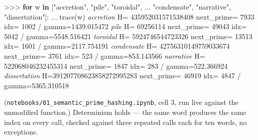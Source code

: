 \documentclass[
  10pt,
]{article}
\newenvironment{Shaded}{}{}
\newcommand{\CommentTok}[1]{\textcolor[rgb]{0.38,0.63,0.69}{\textit{#1}}}
\newcommand{\ControlFlowTok}[1]{\textcolor[rgb]{0.00,0.44,0.13}{\textbf{#1}}}
\newcommand{\DecValTok}[1]{\textcolor[rgb]{0.25,0.63,0.44}{#1}}
\newcommand{\FloatTok}[1]{\textcolor[rgb]{0.25,0.63,0.44}{#1}}
\newcommand{\KeywordTok}[1]{\textcolor[rgb]{0.00,0.44,0.13}{\textbf{#1}}}
\newcommand{\NormalTok}[1]{#1}
\newcommand{\OperatorTok}[1]{\textcolor[rgb]{0.40,0.40,0.40}{#1}}
\newcommand{\StringTok}[1]{\textcolor[rgb]{0.25,0.44,0.63}{#1}}
\begin{document}
\begin{Shaded}
\begin{Highlighting}[]
\OperatorTok{\textgreater{}\textgreater{}\textgreater{}} \ControlFlowTok{for}\NormalTok{ w }\KeywordTok{in}\NormalTok{ [}\StringTok{"accretion"}\NormalTok{, }\StringTok{"pile"}\NormalTok{, }\StringTok{"toroidal"}\NormalTok{,}
\NormalTok{...           }\StringTok{"condensate"}\NormalTok{, }\StringTok{"narrative"}\NormalTok{, }\StringTok{"dissertation"}\NormalTok{]:}
\NormalTok{...     trace(w)}
   \CommentTok{\textquotesingle{}accretion\textquotesingle{}}\NormalTok{  H}\OperatorTok{=}    \DecValTok{435952031571538408}\NormalTok{  next\_prime}\OperatorTok{=}  \DecValTok{7933}\NormalTok{  idx}\OperatorTok{=} \DecValTok{1002}  \OperatorTok{/}
\NormalTok{                gamma}\OperatorTok{=}\FloatTok{1439.015472}
        \CommentTok{\textquotesingle{}pile\textquotesingle{}}\NormalTok{  H}\OperatorTok{=}              \DecValTok{69256114}\NormalTok{  next\_prime}\OperatorTok{=} \DecValTok{49043}\NormalTok{  idx}\OperatorTok{=} \DecValTok{5042}  \OperatorTok{/}
\NormalTok{                gamma}\OperatorTok{=}\FloatTok{5548.516421}
    \CommentTok{\textquotesingle{}toroidal\textquotesingle{}}\NormalTok{  H}\OperatorTok{=}      \DecValTok{5924746544723326}\NormalTok{  next\_prime}\OperatorTok{=} \DecValTok{13513}\NormalTok{  idx}\OperatorTok{=} \DecValTok{1601}  \OperatorTok{/}
\NormalTok{                gamma}\OperatorTok{=}\FloatTok{2117.754191}
  \CommentTok{\textquotesingle{}condensate\textquotesingle{}}\NormalTok{  H}\OperatorTok{=}  \DecValTok{42756310149759033674}\NormalTok{  next\_prime}\OperatorTok{=}  \DecValTok{3761}\NormalTok{  idx}\OperatorTok{=}  \DecValTok{523}  \OperatorTok{/}
\NormalTok{                gamma}\OperatorTok{=}\FloatTok{853.143566}
   \CommentTok{\textquotesingle{}narrative\textquotesingle{}}\NormalTok{  H}\OperatorTok{=}    \DecValTok{522068046232455314}\NormalTok{  next\_prime}\OperatorTok{=}  \DecValTok{1847}\NormalTok{  idx}\OperatorTok{=}  \DecValTok{283}  \OperatorTok{/}
\NormalTok{                gamma}\OperatorTok{=}\FloatTok{522.366924}
\CommentTok{\textquotesingle{}dissertation\textquotesingle{}}\NormalTok{  H}\OperatorTok{=}\DecValTok{391207708623858272995283}\NormalTok{  next\_prime}\OperatorTok{=} \DecValTok{46919}\NormalTok{  idx}\OperatorTok{=} \DecValTok{4847}  \OperatorTok{/}
\NormalTok{                gamma}\OperatorTok{=}\FloatTok{5365.310518}
\end{Highlighting}
\end{Shaded}

(\texttt{notebooks/01\_semantic\_prime\_hashing.ipynb}, cell 3, run live
against the unmodified function.) Determinism holds --- the same word
produces the same index on every call, checked against three repeated
calls each for ten words, no exceptions.
\end{document}

